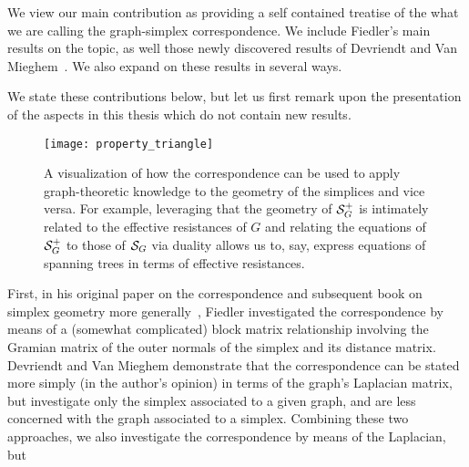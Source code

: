 We view our main contribution as providing a self contained treatise  of the what we are  calling the graph-simplex correspondence. We include Fiedler's main results  on the topic, as well those newly discovered results of Devriendt and Van Mieghem~\cite{devriendt2018simplex}. We also expand on these results in several ways. 

We state these contributions below, but let us first remark upon the  presentation of the aspects in this thesis which do not contain new results.  

\begin{wrapfigure}{R}{0.5\linewidth}
	\centering
	\texttt{[image: property\_triangle]}
	\caption{A visualization of how the correspondence can be used to apply graph-theoretic knowledge to the geometry  of the simplices and vice versa. For example, leveraging that the geometry of $\mathcal{S}_G^+$ is intimately related to the effective resistances of $G$ and relating the equations of $\mathcal{S}_G^+$  to those of $\mathcal{S}_G$ via duality allows us  to, say, express equations of spanning trees in terms of effective resistances.  }
	\label{fig:property_triangle}
\end{wrapfigure} 


First, in his original paper on the correspondence and subsequent book on simplex geometry more generally~\cite{fiedler2011matrices}, Fiedler  investigated the correspondence by means of a (somewhat complicated) block matrix relationship involving the Gramian matrix of the outer normals of the simplex and its distance matrix. Devriendt  and Van Mieghem demonstrate that the correspondence can be stated more simply (in the author's opinion) in terms of the graph's Laplacian matrix, but investigate only the simplex associated to a given graph, and are less concerned with the graph associated to a simplex. Combining these two approaches, we also investigate the correspondence by means of the Laplacian, but 



